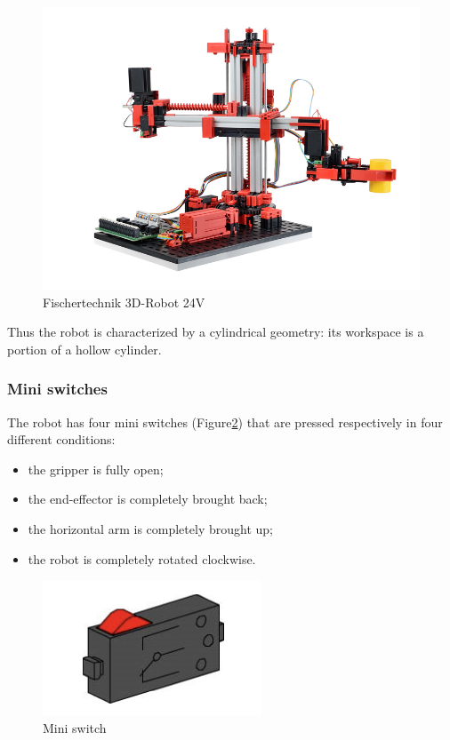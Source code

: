 \begin{figure}[!h]
\begin{center}
\includegraphics[width=0.8\linewidth]{capitolo2/figure/3D-Robot-24V.jpeg}
\caption{Fischertechnik 3D-Robot 24V}
\label{fig:robot}
\end{center}
\end{figure}
Thus the robot is characterized by a cylindrical geometry: its workspace is a portion of a hollow cylinder.

\subsubsection{Mini switches}
The robot has four mini switches (Figure\ref{fig:switch}) that are pressed respectively in four different conditions:
\begin{itemize}
    \item the gripper is fully open;
    \item the end-effector is completely brought back;
    \item the horizontal arm is completely brought up;
    \item the robot is completely rotated clockwise.
\end{itemize}

\begin{figure}[!h]
\begin{center}
\includegraphics[width=0.4\linewidth]{capitolo2/figure/mini_switch.png}
\caption{Mini switch}
\label{fig:switch}
\end{center}
\end{figure}

